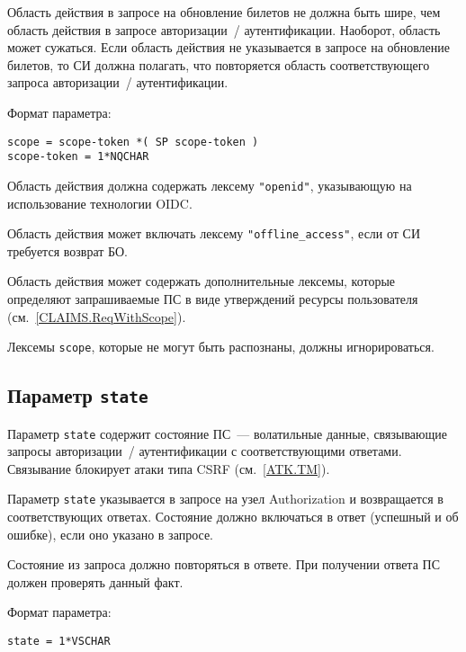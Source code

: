 Область действия в запросе на обновление билетов не должна быть шире, чем 
область действия в запросе авторизации~/ аутентификации. Наоборот, область
может сужаться. 
%
Если область действия не указывается в запросе на обновление билетов,
то СИ должна полагать, что повторяется область соответствующего запроса
авторизации~/ аутентификации.

Формат параметра:
\begin{lstlisting}
scope = scope-token *( SP scope-token )
scope-token = 1*NQCHAR
\end{lstlisting}

Область действия должна содержать лексему \lstinline{"openid"},
указывающую на использование технологии OIDC. 

Область действия может включать лексему \lstinline{"offline_access"}, 
если от СИ требуется возврат БО. 

Область действия может содержать дополнительные лексемы, которые 
определяют запрашиваемые ПС в виде утверждений ресурсы пользователя
(см.~\ref{CLAIMS.ReqWithScope}). 

Лексемы \lstinline{scope}, которые не могут быть распознаны, должны 
игнорироваться.

\subsection{Параметр \lstinline{state}}\label{PARAMS.State} 

Параметр \lstinline{state} содержит состояние ПС~--- волатильные данные, 
связывающие запросы авторизации~/ аутентификации с соответствующими ответами. 
%
Связывание блокирует атаки типа CSRF (см.~\ref{ATK.TM}).

Параметр \lstinline{state} указывается в запросе на узел Authorization и 
возвращается в соответствующих ответах.
%
Состояние должно включаться в ответ (успешный и об ошибке), если оно указано в 
запросе. 

Состояние из запроса должно повторяться в ответе. При получении ответа ПС 
должен проверять данный факт.

Формат параметра:
\begin{lstlisting}
state = 1*VSCHAR
\end{lstlisting}

	
